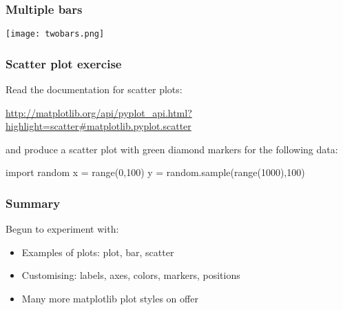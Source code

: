 \documentclass{beamer}
\begin{document}
\begin{frame}[fragile]
\frametitle{Multiple bars}
\texttt{[image: twobars.png]}
\end{frame}


\begin{frame}[fragile]
\frametitle{Scatter plot exercise}
Read the documentation for scatter plots:

\url{http://matplotlib.org/api/pyplot_api.html?highlight=scatter#matplotlib.pyplot.scatter}

and produce a scatter plot with green diamond
markers for the following data:
\begin{code}
import random
x = range(0,100)
y = random.sample(range(1000),100)
\end{code}
\end{frame}

\begin{frame}[fragile]
\frametitle{Summary}
Begun to experiment with:
\begin{itemize}
\item Examples of plots: plot, bar, scatter
\item Customising: labels, axes, colors, markers, positions
\item Many more matplotlib plot styles on offer 
\end{itemize}
\end{frame}
\end{document}
